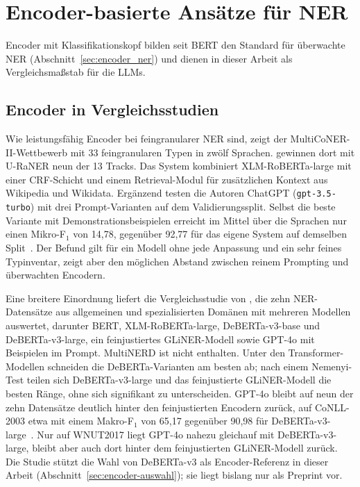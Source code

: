 \section{Encoder-basierte Ansätze für NER}
\label{sec:encoder_ner_related}

Encoder mit Klassifikationskopf bilden seit BERT den Standard für
überwachte NER (Abschnitt~\ref{sec:encoder_ner}) und dienen in dieser
Arbeit als Vergleichsmaßstab für die LLMs.


\subsection{Encoder in Vergleichsstudien}
\label{sec:k3-encoder-vergleich}

Wie leistungsfähig Encoder bei feingranularer NER sind, zeigt der
MultiCoNER-II-Wettbewerb mit 33 feingranularen Typen in zwölf Sprachen.
\textcite{tan2023damo} gewinnen dort mit U-RaNER neun der 13 Tracks.
Das System kombiniert XLM-RoBERTa-large mit einer CRF-Schicht und einem
Retrieval-Modul für zusätzlichen Kontext aus Wikipedia und Wikidata.
Ergänzend testen die Autoren ChatGPT (\texttt{gpt-3.5-turbo}) mit drei
Prompt-Varianten auf dem Validierungssplit.
Selbst die beste Variante mit Demonstrationsbeispielen erreicht im Mittel
über die Sprachen nur einen Mikro-F$_1$ von 14{,}78, gegenüber 92{,}77
für das eigene System auf demselben Split~\cite[Tab.~4]{tan2023damo}.
Der Befund gilt für ein Modell ohne jede Anpassung und ein sehr feines
Typinventar, zeigt aber den möglichen Abstand zwischen reinem Prompting
und überwachten Encodern.

Eine breitere Einordnung liefert die Vergleichsstudie von
\textcite{keraghel2024recent}, die zehn NER-Datensätze aus allgemeinen
und spezialisierten Domänen mit mehreren Modellen auswertet, darunter
BERT, XLM-RoBERTa-large,
DeBERTa-v3-base und DeBERTa-v3-large, ein feinjustiertes GLiNER-Modell
sowie GPT-4o mit Beispielen im Prompt.
MultiNERD ist nicht enthalten.
Unter den Transformer-Modellen schneiden die DeBERTa-Varianten am
besten ab; nach einem Nemenyi-Test teilen sich DeBERTa-v3-large und
das feinjustierte GLiNER-Modell die besten Ränge, ohne sich signifikant
zu unterscheiden.
GPT-4o bleibt auf neun der zehn Datensätze deutlich hinter den
feinjustierten Encodern zurück, auf CoNLL-2003 etwa mit einem
Makro-F$_1$ von 65{,}17 gegenüber 90{,}98 für
DeBERTa-v3-large~\cite[Tab.~5]{keraghel2024recent}.
Nur auf WNUT2017 liegt GPT-4o nahezu gleichauf mit DeBERTa-v3-large,
bleibt aber auch dort hinter dem feinjustierten GLiNER-Modell zurück.
Die Studie stützt die Wahl von DeBERTa-v3 als Encoder-Referenz in dieser
Arbeit (Abschnitt~\ref{sec:encoder-auswahl}); sie liegt bislang nur als
Preprint vor.

